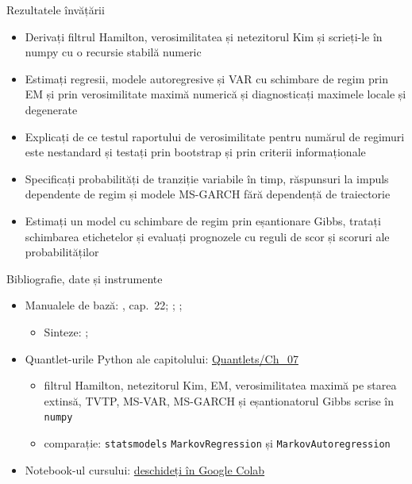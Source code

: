 \begin{frame}{Rezultatele învățării}
\itemsize{\small}
\begin{itemize}
    \item Derivați filtrul Hamilton, verosimilitatea și netezitorul Kim și scrieți-le în numpy cu o recursie stabilă numeric
    \item Estimați regresii, modele autoregresive și VAR cu schimbare de regim prin EM și prin verosimilitate maximă numerică și diagnosticați maximele locale și degenerate
    \item Explicați de ce testul raportului de verosimilitate pentru numărul de regimuri este nestandard și testați prin bootstrap și prin criterii informaționale
    \item Specificați probabilități de tranziție variabile în timp, răspunsuri la impuls dependente de regim și modele MS-GARCH fără dependență de traiectorie
    \item Estimați un model cu schimbare de regim prin eșantionare Gibbs, tratați schimbarea etichetelor și evaluați prognozele cu reguli de scor și scoruri ale probabilităților
\end{itemize}
\end{frame}

\begin{frame}{Bibliografie, date și instrumente}
\itemsize{\small}
\begin{itemize}
    \item Manualele de bază: , cap.~22; ; ; 
    \begin{itemize}
        \item Sinteze: ; 
    \end{itemize}
    \item Quantlet-urile Python ale capitolului: \href{https://github.com/danpele/Advanced-Time-Series/tree/main/Quantlets/Ch_07}{Quantlets/Ch\_07}
    \begin{itemize}
        \item filtrul Hamilton, netezitorul Kim, EM, verosimilitatea maximă pe starea extinsă, TVTP, MS-VAR, MS-GARCH și eșantionatorul Gibbs scrise în \texttt{numpy}
        \item comparație: \texttt{statsmodels} \texttt{MarkovRegression} și \texttt{MarkovAutoregression}
    \end{itemize}
    \item Notebook-ul cursului: \href{\colaburl{notebooks/EN/chapter7_lecture_notebook.ipynb}}{deschideți în Google Colab}
\end{itemize}
\end{frame}

